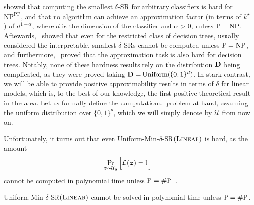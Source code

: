 \citet{Waldchen_MacDonald_Hauch_Kutyniok_2021} showed that computing the smallest $\delta$-SR for arbitrary classifiers is hard for $\textrm{NP}^{\textrm{PP}}$, and that no algorithm can achieve an approximation factor (in terms of $k^\star$) of $d^{1-\alpha}$, where $d$ is the dimension of the classifier and $\alpha > 0$, unless $\mathrm{P} = \textrm{NP}$. Aftewards,~\citet{Arenas_Barcelo_Romero_Subercaseaux_2022} showed that even for the restricted class of decision trees, usually considered the interpretable, smallest $\delta$-SRs cannot be computed unless $\mathrm{P} = \textrm{NP}$, and furthermore,~\citet{Kozachinskiy_2023} proved that the approximation task is also hard for decision trees. Notably, none of these hardness results rely on the distribution $\mathbf{D}$ being complicated, as they were proved taking $\mathbf{D} = \textrm{Uniform}(\{0, 1\}^d)$. 
In stark contrast, we will be able to provide positive approximability results in terms of $\delta$ for linear models, which is, to the best of our knowledge, the first positive theoretical result in the area.
Let us formally define the computational problem at hand, assuming the uniform distribution over $\{0, 1\}^d$, which we will simply denote by $\mathcal{U}$ from now on.



 
Unfortunately, it turns out that even Uniform-Min-$\delta$-SR$(\textsc{Linear})$ is hard, as the amount
\[
    \Pr_{{\bm{z}} \sim  \mathcal{U}_{\bm{y}}}\Big[\mathcal{L}({\bm{z}}) = 1\Big]
\]
cannot be computed in polynomial time unless $\mathrm{P}=\# \mathrm{P}$~\cite{NEURIPS2020_b1adda14}. 

\begin{proposition}\label{prop:hardness}
    Uniform-Min-$\delta$-SR$(\textsc{Linear})$ cannot be solved in polynomial time unless $\mathrm{P} = \# \mathrm{P}$.
\end{proposition}



